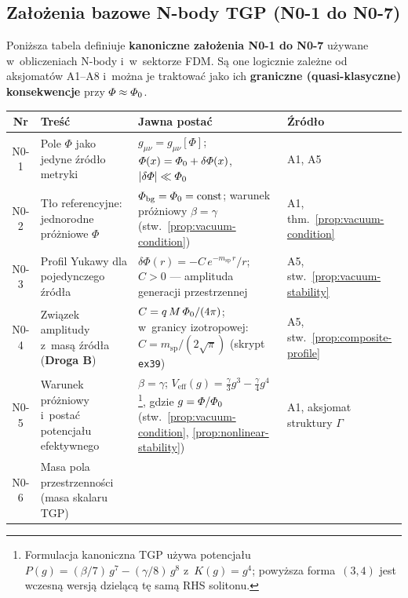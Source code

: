 \subsection{Za\l{}o\.zenia bazowe N-body TGP (N0-1 do N0-7)}
\label{ssec:N0-lista}

Poni\.zsza tabela definiuje \textbf{kanoniczne za\l{}o\.zenia N0-1 do N0-7}
u\.zywane w~obliczeniach N-body i~w~sektorze FDM.
S\k{a} one logicznie zale\.zne od aksjomat\'ow A1--A8 i~mo\.zna je traktowa\'c
jako ich \textbf{graniczne (quasi-klasyczne) konsekwencje} przy $\varPhi \approx \varPhi_0$.

\begin{center}
\begin{tabular}{@{}clp{7.5cm}l@{}}
\toprule
\textbf{Nr} & \textbf{Tre\'s\'c}
  & \textbf{Jawna posta\'c} & \textbf{\'Zr\'od\l{}o} \\
\midrule
N0-1
  & Pole $\Phi$ jako jedyne \'zr\'od\l{}o metryki
  & $g_{\mu\nu} = g_{\mu\nu}[\Phi]$;
    $\varPhi(x) = \varPhi_0 + \delta\varPhi(x)$,
    $|\delta\varPhi| \ll \varPhi_0$
  & A1, A5 \\[4pt]
N0-2
  & T\l{}o referencyjne: jednorodne pr\'o\.zniowe $\Phi$
  & $\varPhi_{\mathrm{bg}} = \varPhi_0 = \mathrm{const}$;
    warunek pr\'o\.zniowy $\beta = \gamma$
    (stw.~\ref{prop:vacuum-condition})
  & A1, thm.~\ref{prop:vacuum-condition} \\[4pt]
N0-3
  & Profil Yukawy dla pojedynczego \'zr\'od\l{}a
  & $\delta\Phi(r) = -C\,e^{-m_{\mathrm{sp}}\,r}/r$;
    $C > 0$ --- amplituda generacji przestrzennej
  & A5, stw.~\ref{prop:vacuum-stability} \\[4pt]
N0-4
  & Zwi\k{a}zek amplitudy z~mas\k{a} \'zr\'od\l{}a
    (\textbf{Droga B})
  & $C = q\,M\,\varPhi_0 / (4\pi)$;
    w~granicy izotropowej: $C = m_{\mathrm{sp}}/(2\sqrt{\pi})$
    (skrypt \texttt{ex39})
  & A5, stw.~\ref{prop:composite-profile} \\[4pt]
N0-5
  & Warunek pr\'o\.zniowy i~posta\'c potencja\l{}u efektywnego
  & $\beta = \gamma$;
    $V_{\mathrm{eff}}(g) = \frac{\gamma}{3}g^3 - \frac{\gamma}{4}g^4$\footnote{Formulacja kanoniczna TGP u\.zywa potencja\l{}u $P(g) = (\beta/7)\,g^7 - (\gamma/8)\,g^8$ z~$K(g) = g^4$; powy\.zsza forma~$(3,4)$ jest wczesn\k{a} wersj\k{a} dziel\k{a}c\k{a} t\k{e} sam\k{a} RHS solitonu.},
    gdzie $g = \varPhi/\varPhi_0$
    (stw.~\ref{prop:vacuum-condition}, \ref{prop:nonlinear-stability})
  & A1, aksjomat struktury $\Gamma$ \\[4pt]
N0-6
  & Masa pola przestrzenno\'sci (masa skalaru TGP)

\end{tabular}
\end{center}
